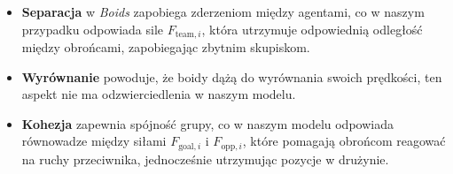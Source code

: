 \documentclass{article}
\begin{document}
\begin{itemize}
    \item \textbf{Separacja} w \textit{Boids} zapobiega zderzeniom między agentami, co w naszym przypadku odpowiada sile \( F_{\text{team}, i} \), która utrzymuje odpowiednią odległość między obrońcami, zapobiegając zbytnim skupiskom.  
    \item \textbf{Wyrównanie} powoduje, że boidy dążą do wyrównania swoich prędkości, ten aspekt nie ma odzwierciedlenia w naszym modelu.  
    \item \textbf{Kohezja} zapewnia spójność grupy, co w naszym modelu odpowiada równowadze między siłami \( F_{\text{goal}, i} \) i \( F_{\text{opp}, i} \), które pomagają obrońcom reagować na ruchy przeciwnika, jednocześnie utrzymując pozycje w drużynie.
\end{itemize}
\end{document}
